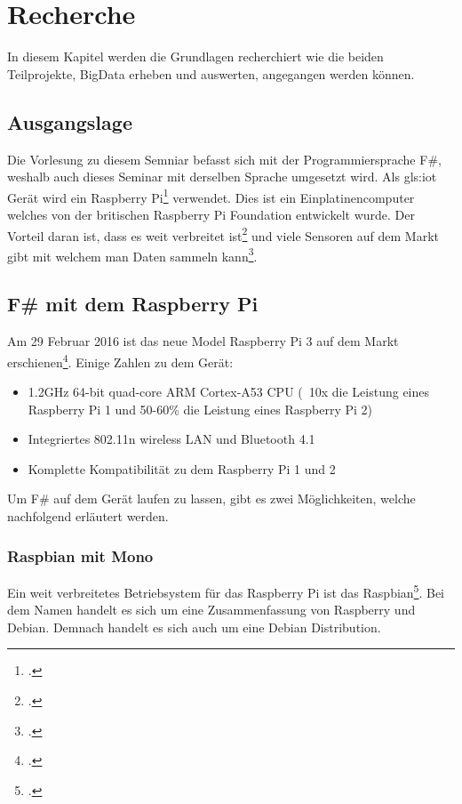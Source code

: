 
\chapter{Recherche}
In diesem Kapitel werden die Grundlagen recherchiert wie die beiden Teilprojekte, BigData erheben und auswerten, angegangen werden können.

\section{Ausgangslage}
Die Vorlesung zu diesem Semniar befasst sich mit der Programmiersprache F\#, weshalb auch dieses Seminar mit derselben Sprache umgesetzt wird. Als \Gls{gls:iot} Gerät wird ein Raspberry Pi\footcite{Raspberry_Pi_2016-04-24} verwendet. Dies ist ein Einplatinencomputer welches von der britischen Raspberry Pi Foundation entwickelt wurde. Der Vorteil daran ist, dass es weit verbreitet ist\footcite{Raspberry_Pi_Erfolgsgeschichte_2016-04-24} und viele Sensoren auf dem Markt gibt mit welchem man Daten sammeln kann\footcite{Raspberry_Pi_Sensor_2016-04-24}.

\section{F\# mit dem Raspberry Pi}
\label{sec:recherche:fsharprpi}
Am 29 Februar 2016 ist das neue Model Raspberry Pi 3 auf dem Markt erschienen\footcite{Raspberry_Pi_3_2016-04-24}. Einige Zahlen zu dem Gerät:

\begin{itemize}
\item 1.2GHz 64-bit quad-core ARM Cortex-A53 CPU (~10x die Leistung eines Raspberry Pi 1 und 50-60\% die Leistung eines Raspberry Pi 2)
\item Integriertes 802.11n wireless LAN und Bluetooth 4.1
\item Komplette Kompatibilität zu dem Raspberry Pi 1 und 2
\end{itemize} 

Um F\# auf dem Gerät laufen zu lassen, gibt es zwei Möglichkeiten, welche nachfolgend erläutert werden.

\subsection{Raspbian mit Mono}
Ein weit verbreitetes Betriebsystem für das Raspberry Pi ist das Raspbian\footcite{FrontPage_-_Raspbian_2016-04-24}. Bei dem Namen handelt es sich um eine Zusammenfassung von Raspberry und Debian. Demnach handelt es sich auch um eine Debian Distribution.

